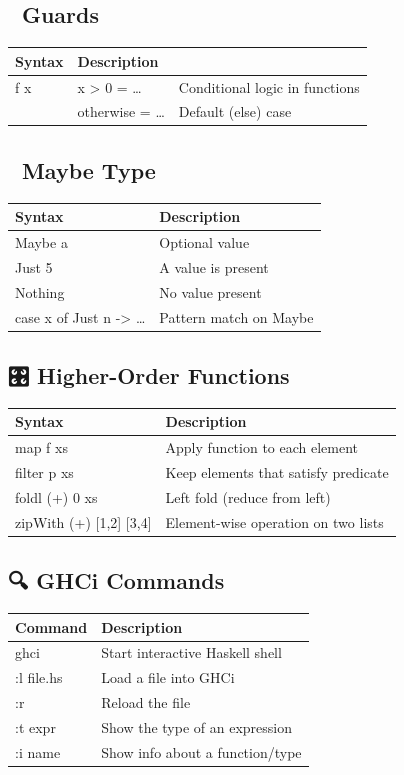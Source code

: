 \documentclass[11pt]{article}
\begin{document}
\subsection{🧠 Guards}
\label{sec:orged9989c}
\begin{center}
\begin{tabular}{ll}
Syntax & Description\\
\hline
f x & x > 0 = \ldots{} & Conditional logic in functions\\
 & otherwise = \ldots{} & Default (else) case\\
\end{tabular}
\end{center}
\subsection{🧪 Maybe Type}
\label{sec:org4a776a8}
\begin{center}
\begin{tabular}{ll}
Syntax & Description\\
\hline
Maybe a & Optional value\\
Just 5 & A value is present\\
Nothing & No value present\\
case x of Just n -> \ldots{} & Pattern match on Maybe\\
\end{tabular}
\end{center}
\subsection{🎛 Higher-Order Functions}
\label{sec:org5762965}
\begin{center}
\begin{tabular}{ll}
Syntax & Description\\
\hline
map f xs & Apply function to each element\\
filter p xs & Keep elements that satisfy predicate\\
foldl (+) 0 xs & Left fold (reduce from left)\\
zipWith (+) [1,2] [3,4] & Element-wise operation on two lists\\
\end{tabular}
\end{center}
\subsection{🔍 GHCi Commands}
\label{sec:org6fe3816}
\begin{center}
\begin{tabular}{ll}
Command & Description\\
\hline
ghci & Start interactive Haskell shell\\
:l file.hs & Load a file into GHCi\\
:r & Reload the file\\
:t expr & Show the type of an expression\\
:i name & Show info about a function/type\\
\end{tabular}
\end{center}
\end{document}

